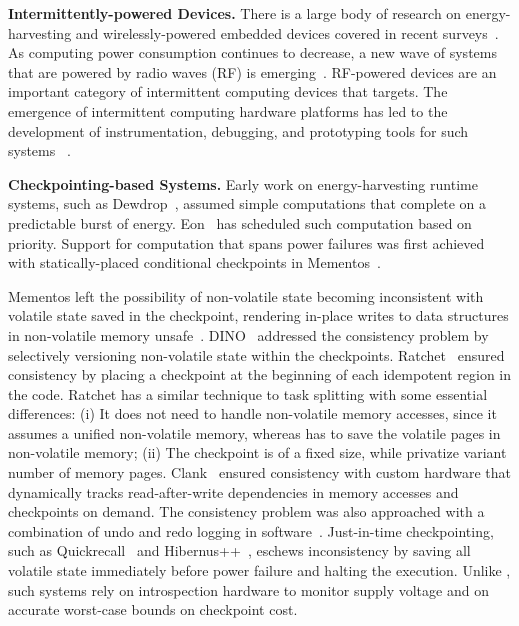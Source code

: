 \textbf{Intermittently-powered Devices.} There is a large body of research on
energy-harvesting and wirelessly-powered embedded devices covered in recent
surveys~\cite{prasad_comst_2014,sample_procieee_2013,huang:commag:2015,visser_procieee_2013,kamalinejad_commag_2015,ku_cst_2016}.
As computing power consumption continues to decrease, a new wave of
systems that are powered by radio waves (RF) is
emerging~\cite{patel_pervasive_2017,rf_powered_computing_gollakota_2014,wisp5,moo,zhao_rfid_2015,holleman_biocas_2008,thomas_jbcs_2012,naderiparizi_rfid_2015,rodriguez_tbcs_2015,liu_sigcomm_2013,kicksat,nadeau_naturebio_2017}.
RF-powered devices are an important category of intermittent computing devices
that \sys targets.  The emergence of intermittent computing hardware platforms
has led to the development of instrumentation, debugging, and prototyping tools
for such systems
~\cite{hester_sensys_2014,hester_sensys_2015,edb,capybara,stork,wisent,flicker}.

\textbf{Checkpointing-based Systems.} Early work on energy-harvesting runtime
systems, such as Dewdrop~\cite{dewdrop}, assumed simple computations
that complete on a predictable burst of energy.
Eon~\cite{sorber_sensys_2007} has scheduled such computation based on priority.
Support for computation that spans power failures was first achieved with
statically-placed conditional checkpoints in Mementos~\cite{mementos}.

Mementos left the possibility of non-volatile state becoming inconsistent with
volatile state saved in the checkpoint, rendering in-place writes to data
structures in non-volatile memory unsafe~\cite{mspcdino}.
%
DINO~\cite{dino} addressed the consistency problem by selectively versioning
non-volatile state within the checkpoints. Ratchet~\cite{ratchet} ensured
consistency by placing a checkpoint at the beginning of each idempotent region
in the code. Ratchet has a similar technique to task splitting with some essential differences: (i) It does not need to handle non-volatile memory accesses, since it assumes a unified non-volatile memory, whereas \sys has to save the volatile pages in non-volatile memory; (ii) The checkpoint is of a fixed size, while \sys privatize variant number of memory pages.  Clank~\cite{hicks_isca_2017} ensured consistency with custom
hardware that dynamically tracks read-after-write dependencies in memory
accesses and checkpoints on demand. The consistency problem was also
approached with a combination of undo and redo logging in
software~\cite{baghsorkhi_cgo_2018}.
%
Just-in-time checkpointing, such as Quickrecall~\cite{quickrecall} and
Hibernus++~\cite{hibernusplusplus}, eschews inconsistency by saving all
volatile state immediately before power failure and halting the execution.
Unlike \sys, such systems rely on introspection hardware to monitor supply
voltage and on accurate worst-case bounds on checkpoint cost.

